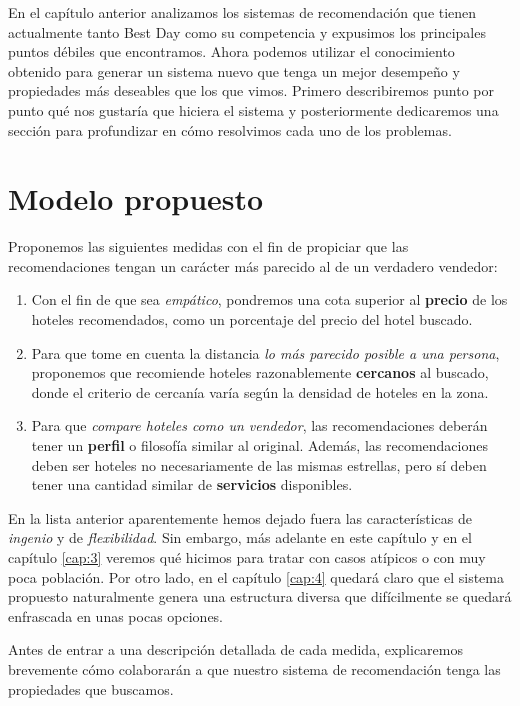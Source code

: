 \documentclass[12pt]{report}
\begin{document}
En el capítulo anterior analizamos los sistemas de recomendación que tienen actualmente tanto Best Day como su competencia y expusimos los principales puntos débiles que encontramos. Ahora podemos utilizar el conocimiento obtenido para generar un sistema nuevo que tenga un mejor desempeño y propiedades más deseables que los que vimos. Primero describiremos punto por punto qué nos gustaría que hiciera el sistema y posteriormente dedicaremos una sección para profundizar en cómo resolvimos cada uno de los problemas.

\section{Modelo propuesto}

Proponemos las siguientes medidas con el fin de propiciar que las recomendaciones tengan un carácter más parecido al de un verdadero vendedor:
\begin{enumerate}
	\item Con el fin de que sea \emph{empático}, pondremos una cota superior al \textbf{precio} de los hoteles recomendados, como un porcentaje del precio del hotel buscado.
	\item Para que tome en cuenta la distancia \emph{lo más parecido posible a una persona}, proponemos que recomiende hoteles razonablemente \textbf{cercanos} al buscado, donde el criterio de cercanía varía según la densidad de hoteles en la zona.
	\item Para que \emph{compare hoteles como un vendedor}, las recomendaciones deberán tener un \textbf{perfil} o filosofía similar al original. Además, las recomendaciones deben ser hoteles no necesariamente de las mismas estrellas, pero sí deben tener una cantidad similar de \textbf{servicios} disponibles.
\end{enumerate}
En la lista anterior aparentemente hemos dejado fuera las características de \emph{ingenio} y de \emph{flexibilidad}. Sin embargo, más adelante en este capítulo y en el capítulo \ref{cap:3} veremos qué hicimos para tratar con casos atípicos o con muy poca población. Por otro lado, en el capítulo \ref{cap:4} quedará claro que el sistema propuesto naturalmente genera una estructura diversa que difícilmente se quedará enfrascada en unas pocas opciones.

Antes de entrar a una descripción detallada de cada medida, explicaremos brevemente cómo colaborarán a que nuestro sistema de recomendación tenga las propiedades que buscamos.
\end{document}

